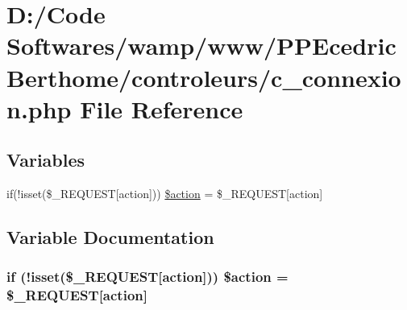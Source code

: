 \hypertarget{c__connexion_8php}{}\section{D\+:/\+Code Softwares/wamp/www/\+P\+P\+Ecedric\+Berthome/controleurs/c\+\_\+connexion.php File Reference}
\label{c__connexion_8php}
\subsection*{Variables}
\begin{DoxyCompactItemize}
\item 
if(!isset(\$\+\_\+\+R\+E\+Q\+U\+E\+ST\mbox{[}\textquotesingle{}action\textquotesingle{}\mbox{]})) \hyperlink{c__connexion_8php_a22594a4d032330e912b21f2b3af11a68}{\$action} = \$\+\_\+\+R\+E\+Q\+U\+E\+ST\mbox{[}\textquotesingle{}action\textquotesingle{}\mbox{]}
\end{DoxyCompactItemize}


\subsection{Variable Documentation}
\subsubsection[{\texorpdfstring{\$action}{$action}}]{\setlength{\rightskip}{0pt plus 5cm}if (!isset(\$\+\_\+\+R\+E\+Q\+U\+E\+ST\mbox{[}\textquotesingle{}action\textquotesingle{}\mbox{]})) \$action = \$\+\_\+\+R\+E\+Q\+U\+E\+ST\mbox{[}\textquotesingle{}action\textquotesingle{}\mbox{]}}\hypertarget{c__connexion_8php_a22594a4d032330e912b21f2b3af11a68}{}\label{c__connexion_8php_a22594a4d032330e912b21f2b3af11a68}
